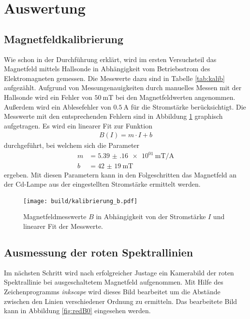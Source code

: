 \section{Auswertung}
\label{sec:Auswertung}

\subsection{Magnetfeldkalibrierung}

Wie schon in der Durchführung erklärt, wird im ersten Versuchsteil das Magnetfeld
mittels Hallsonde in Abhängigkeit vom Betriebsstrom des Elektromagneten gemessen.
Die Messwerte dazu sind in Tabelle \ref{tab:kalib} aufgezählt.
Aufgrund von Messungenauigkeiten durch manuelles Messen mit der Hallsonde wird ein Fehler von $\SI{50}{\milli\tesla}$
bei den Magnetfeldwerten angenommen. Außerdem wird ein Ablesefehler von $\SI{0.5}{\ampere}$ für
die Stromstärke berücksichtigt. Die Messwerte mit den entsprechenden Fehlern sind in
Abbildung \ref{fig:kalib} graphisch aufgetragen. Es wird ein linearer Fit zur Funktion
\begin{align}
  B(I) = m \cdot I + b
\end{align}
durchgeführt, bei welchem sich die Parameter
\begin{align}
  m &= \SI{5.39(16)e01}{\milli\tesla\per\ampere} \\
  b &= \SI{42(19)}{\milli\tesla}
  \label{eqn:kalibparams}
\end{align}
ergeben. Mit diesen Parametern kann in den Folgeschritten das Magnetfeld an der Cd-Lampe aus der
eingestellten Stromstärke ermittelt werden.

\begin{figure}[H]
  \centering
  \texttt{[image: build/kalibrierung\_b.pdf]}
  \caption{Magnetfeldmesswerte $B$ in Abhängigkeit von der Stromstärke $I$ und linearer Fit der Messwerte.}
  \label{fig:kalib}
\end{figure}

\subsection{Ausmessung der roten Spektrallinien}
\label{sec:rotspektr}

Im nächsten Schritt wird nach erfolgreicher Justage ein Kamerabild der roten Spektrallinie
bei ausgeschaltetem Magnetfeld aufgenommen. Mit Hilfe des Zeichenprogramms \textit{inkscape} wird dieses Bild
bearbeitet um die Abstände zwischen den Linien verschiedener Ordnung zu ermitteln. Das bearbeitete Bild
kann in Abbildung \ref{fig:redB0} eingesehen werden.

